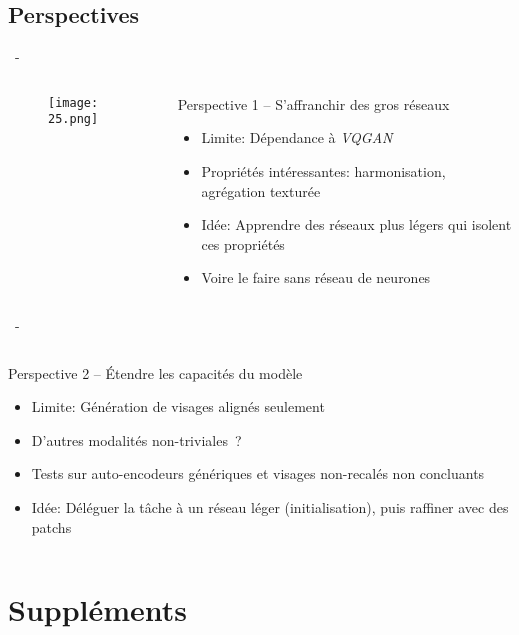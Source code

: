 \documentclass[aspectratio=169, 22pt]{beamer}
\begin{document}
\subsection{Perspectives}
\begin{frame}{\secname~- \subsecname}
  \begin{columns}
    \begin{column}{0.3\linewidth}
      \begin{figure}
        \centering
        \texttt{[image: 25.png]}
      \end{figure}
    \end{column}
    \begin{column}{0.7\linewidth}
      \begin{block}{Perspective 1 – S'affranchir des gros réseaux}
        \begin{itemize}
        \item \alert{Limite}: Dépendance à \emph{VQGAN}
        \item Propriétés intéressantes: harmonisation, agrégation texturée

        \item \alert{Idée}: Apprendre des réseaux plus légers qui isolent ces propriétés
        \item Voire le faire sans réseau de neurones
        \end{itemize}

      \end{block}
    \end{column}
  \end{columns}
\end{frame}

\begin{frame}{\secname~- \subsecname}
  \begin{columns}
    \begin{column}{\linewidth}
      \begin{block}{Perspective 2 – Étendre les capacités du modèle}
        \begin{itemize}
        \item \alert{Limite}: Génération de visages alignés seulement
        \item D'autres modalités non-triviales ?

        \item Tests sur auto-encodeurs génériques et visages non-recalés non concluants
        \item \alert{Idée}: Déléguer la tâche à un réseau léger
          (initialisation), puis raffiner avec des patchs
        \end{itemize}

      \end{block}
    \end{column}
  \end{columns}
\end{frame}


\makethanks

\section{Suppléments}
\end{document}
